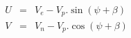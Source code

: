 \begin{eqnarray*}
U & = & V_e - V_p . \sin (\psi + \beta) \\
V & = & V_n - V_p . \cos (\psi + \beta) 
\end{eqnarray*}
